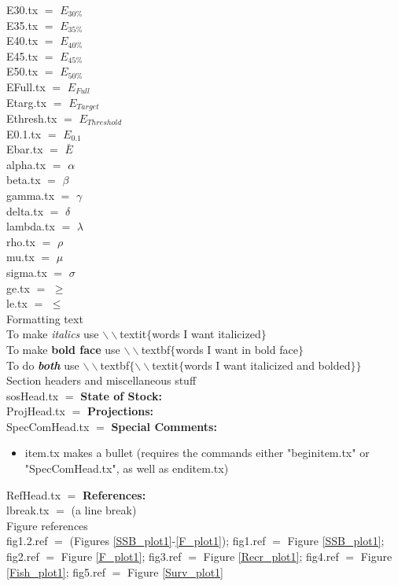 \documentclass[]{report}
\begin{document}
  E30.tx $=$ $E_{30\%}$ \\
  E35.tx $=$ $E_{35\%}$  \\
  E40.tx $=$ $E_{40\%}$  \\
  E45.tx $=$ $E_{45\%}$  \\
  E50.tx $=$ $E_{50\%}$    \\
  EFull.tx $=$ $E_{Full}$ \\
  Etarg.tx $=$ $E_{Target}$ \\ 
  Ethresh.tx $=$ $E_{Threshold}$ \\ 
  E0.1.tx $=$ $E_{0.1}$    \\
  Ebar.tx $=$ $\bar{E}$   \\  
  alpha.tx $=$ $\alpha$    \\
  beta.tx $=$ $\beta$    \\  
  gamma.tx $=$ $\gamma$    \\
  delta.tx $=$ $\delta$    \\
  lambda.tx $=$ $\lambda$    \\  
  rho.tx $=$ $\rho$    \\
  mu.tx $=$ $\mu$    \\	  
  sigma.tx $=$ $\sigma$    \\
  ge.tx $=$ $\geq$    \\
  le.tx $=$ $\leq$    \\
    
  \vspace{1cm}  
  Formatting text \\
  To make \textit{italics} use $\backslash\backslash$textit$\lbrace$words I want italicized$\rbrace$\\
  To make \textbf{bold face} use $\backslash\backslash$textbf$\lbrace$words I want in bold face$\rbrace$\\
  To do \textbf{\textit{both}}	use $\backslash\backslash$textbf$\lbrace\backslash\backslash$textit$\lbrace$words I want italicized and bolded$\rbrace\rbrace$\\  
  
  
  \vspace{1cm}
  Section headers and miscellaneous stuff 
	\\  
  sosHead.tx $=$ \textbf{State of Stock:} \\  
  ProjHead.tx $=$ \textbf{Projections:}   \\
  SpecComHead.tx $=$ \textbf{Special Comments:} \begin{itemize}   
   \item item.tx makes a bullet (requires the commands either "beginitem.tx" or "SpecComHead.tx", as well as enditem.tx) \end{itemize}  
  RefHead.tx $=$ \textbf{References:} \\
  lbreak.tx $=$ \linebreak  (a line break) \\
\vspace{1cm} 
  Figure references
  \\
  fig1.2.ref $=$ (Figures \ref{SSB_plot1}-\ref{F_plot1});
  fig1.ref $=$ Figure \ref{SSB_plot1};
  fig2.ref $=$ Figure \ref{F_plot1}; 	
  fig3.ref $=$ Figure \ref{Recr_plot1};	   
  fig4.ref $=$ Figure \ref{Fish_plot1}; 	
  fig5.ref $=$ Figure \ref{Surv_plot1}
\end{document}
